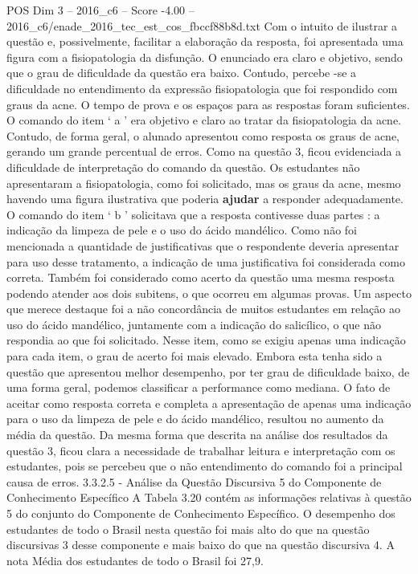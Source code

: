 \begin{textsample}{POS Dim 3 – 2016\_c6 – Score -4.00 – 2016\_c6/enade\_2016\_tec\_est\_cos\_fbccf88b8d.txt}
Com o intuito de ilustrar a questão e, possivelmente, facilitar a elaboração da resposta, foi apresentada uma figura com a fisiopatologia da disfunção.
O enunciado era claro e objetivo, sendo que o grau de dificuldade da questão era baixo.
Contudo, percebe -se a dificuldade no entendimento da expressão fisiopatologia que foi respondido com graus da acne.
O tempo de prova e os espaços para as respostas foram suficientes.
O comando do item ‘ a ’ era objetivo e claro ao tratar da fisiopatologia da acne.
Contudo, de forma geral, o alunado apresentou como resposta os graus de acne, gerando um grande percentual de erros.
Como na questão 3, ficou evidenciada a dificuldade de interpretação do comando da questão.
Os estudantes não apresentaram a fisiopatologia, como foi solicitado, mas os graus da acne, mesmo havendo uma figura ilustrativa que poderia \textbf{ajudar} a responder adequadamente.
O comando do item ‘ b ’ solicitava que a resposta contivesse duas partes : a indicação da limpeza de pele e o uso do ácido mandélico.
Como não foi mencionada a quantidade de justificativas que o respondente deveria apresentar para uso desse tratamento, a indicação de uma justificativa foi considerada como correta.
Também foi considerado como acerto da questão uma mesma resposta podendo atender aos dois subitens, o que ocorreu em algumas provas.
Um aspecto que merece destaque foi a não concordância de muitos estudantes em relação ao uso do ácido mandélico, juntamente com a indicação do salicílico, o que não respondia ao que foi solicitado.
Nesse item, como se exigiu apenas uma indicação para cada item, o grau de acerto foi mais elevado.
Embora esta tenha sido a questão que apresentou melhor desempenho, por ter grau de dificuldade baixo, de uma forma geral, podemos classificar a performance como mediana.
O fato de aceitar como resposta correta e completa a apresentação de apenas uma indicação para o uso da limpeza de pele e do ácido mandélico, resultou no aumento da média da questão.
Da mesma forma que descrita na análise dos resultados da questão 3, ficou clara a necessidade de trabalhar leitura e interpretação com os estudantes, pois se percebeu que o não entendimento do comando foi a principal causa de erros. 3.3.2.5 - Análise da Questão Discursiva 5 do Componente de Conhecimento Específico A Tabela 3.20 contém as informações relativas à questão 5 do conjunto do Componente de Conhecimento Específico.
O desempenho dos estudantes de todo o Brasil nesta questão foi mais alto do que na questão discursivas 3 desse componente e mais baixo do que na questão discursiva 4.
A nota Média dos estudantes de todo o Brasil foi 27,9.

\end{textsample}
